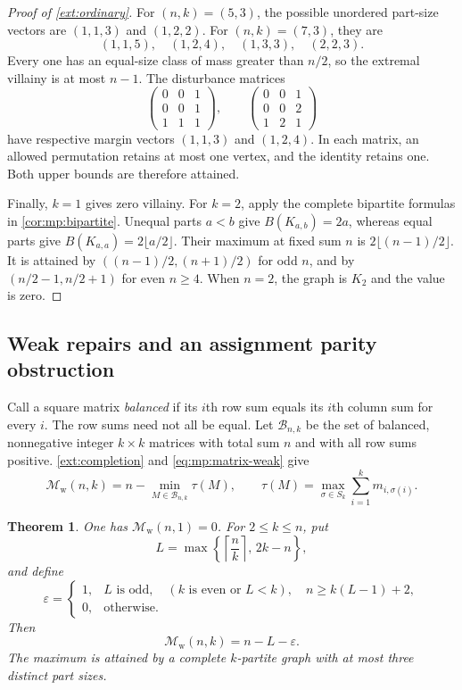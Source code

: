 \documentclass[11pt,reqno]{amsart}
\numberwithin{equation}{section}
\newtheorem{theorem}{Theorem}[section]
\theoremstyle{definition}
\theoremstyle{remark}
\begin{document}
\begin{proof}[Proof of \cref{ext:ordinary}]
For $(n,k)=(5,3)$, the possible unordered part-size vectors are
$(1,1,3)$ and $(1,2,2)$.  For $(n,k)=(7,3)$, they are
\[
 (1,1,5),\quad (1,2,4),\quad (1,3,3),\quad (2,2,3).
\]
Every one has an equal-size class of mass greater than $n/2$, so the
extremal villainy is at most $n-1$.  The disturbance matrices
\[
 \begin{pmatrix}0&0&1\\0&0&1\\1&1&1\end{pmatrix},
 \qquad
 \begin{pmatrix}0&0&1\\0&0&2\\1&2&1\end{pmatrix}
\]
have respective margin vectors $(1,1,3)$ and $(1,2,4)$.  In each
matrix, an allowed permutation retains at most one vertex, and the
identity retains one.  Both upper bounds are therefore attained.

Finally, $k=1$ gives zero villainy.  For $k=2$, apply the complete
bipartite formulas in \cref{cor:mp:bipartite}.  Unequal
parts $a<b$ give $B(K_{a,b})=2a$, whereas equal parts give
$B(K_{a,a})=2\lfloor a/2\rfloor$.  Their maximum at fixed sum $n$
is $2\lfloor(n-1)/2\rfloor$.  It is attained by
$((n-1)/2,(n+1)/2)$ for odd $n$, and by
$(n/2-1,n/2+1)$ for even $n\ge4$.  When $n=2$, the graph is $K_2$
and the value is zero.
\end{proof}

\subsection{Weak repairs and an assignment parity obstruction}

Call a square matrix \emph{balanced} if its $i$th row sum equals its
$i$th column sum for every $i$.  The row sums need not all be equal.
Let $\mathcal B_{n,k}$ be the set of balanced, nonnegative integer
$k\times k$ matrices with total sum $n$ and with all row sums positive.
\cref{ext:completion} and \eqref{eq:mp:matrix-weak} give
\begin{equation}
\label{ext:weak-matrix}
 \mathcal M_{\mathrm w}(n,k)
   =n-\min_{M\in\mathcal B_{n,k}}\tau(M),
 \qquad
 \tau(M)=\max_{\sigma\in S_k}\sum_{i=1}^k m_{i,\sigma(i)}.
\end{equation}
\begin{theorem}
\label{ext:weak}
One has $\mathcal M_{\mathrm w}(n,1)=0$.  For $2\le k\le n$, put
\[
 L=\max\left\{\left\lceil\frac nk\right\rceil,\,2k-n\right\},
\]
and define
\[
 \varepsilon=
 \begin{cases}
  1,& L\text{ is odd},\quad (k\text{ is even or }L<k),
       \quad n\ge k(L-1)+2,\\
  0,&\text{otherwise}.
 \end{cases}
\]
Then
\[
 \mathcal M_{\mathrm w}(n,k)=n-L-\varepsilon.
\]
The maximum is attained by a complete $k$-partite graph with at most
three distinct part sizes.
\end{theorem}
\end{document}
